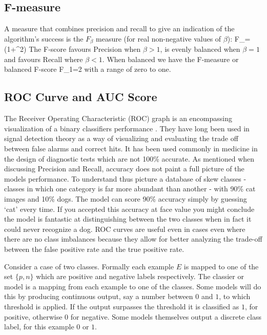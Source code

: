 	\subsection{F-measure}
    
A measure that combines precision and recall to give an indication of the algorithm's success is the $F_\beta$ measure (for real non-negative values of $\beta$)\citep{sokolova2006beyond}\citep{davis2006relationship}:
\be
F_\beta=\left(1+\beta^2\right)
\ee
The F-score favours Precision when $\beta > 1$, is evenly balanced when $\beta = 1$ and favours Recall where $\beta < 1$.
When balanced we have the F-measure or balanced F-score
\be
F_1=2
\ee
with a range of zero to one.

	\subsection{ROC Curve and AUC Score}
     


The Receiver Operating Characteristic (ROC) graph is an encompassing visualization of a binary classifiers performance \citep{fawcett2006introduction} \citep{davis2006relationship} \citep{sokolova2006beyond}.
They have long been used in signal detection theory as a way of visualizing and evaluating the trade off between false alarms and correct hits.
It has been used commonly in medicine in the design of diagnostic tests which are not 100\% accurate.
As mentioned when discussing Precision and Recall, accuracy does not paint a full picture of the models performance.
To understand thus picture a database of skew classes - classes in which one category is far more abundant than another - with 90\% cat images and 10\% dogs.
The model can score 90\% accuracy simply by guessing `cat' every time.
If you accepted this accuracy at face value you might conclude the model is fantastic at distinguishing between the two classes when in fact it could never recognize a dog.
ROC curves are useful even in cases even where there are no class imbalances because they allow for better analyzing the trade-off between the false positive rate and the true positive rate.
        
Consider a case of two classes.
Formally each example $E$ is mapped to one of the set $\{p,n\}$ which are positive and negative labels respectively.
The classier or model is a mapping from each example to one of the classes.
Some models will do this by producing continuous output, say a number between $0$ and $1$, to which threshold is applied.
If the output surpasses the threshold it is classified as $1$, for positive, otherwise $0$ for negative.
Some models themselves output a discrete class label, for this example $0$ or $1$.

